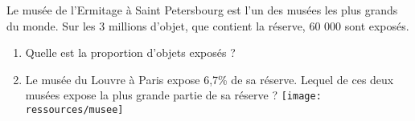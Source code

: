 \begin{multicols}{2}
\exo{}
Le musée de l'Ermitage à Saint Petersbourg est l'un des musées les plus grands du monde. Sur les 3 millions d'objet, que contient la réserve, 60 000 sont exposés. 
\begin{enumerate}[label=\textbf{\alph*.}]
\item Quelle est la proportion d'objets exposés ?
\item Le musée du Louvre à Paris expose 6,7\% de sa réserve. Lequel de ces deux musées expose la plus grande partie de sa réserve ?	
\texttt{[image: ressources/musee]}
\end{enumerate}

\end{multicols}
